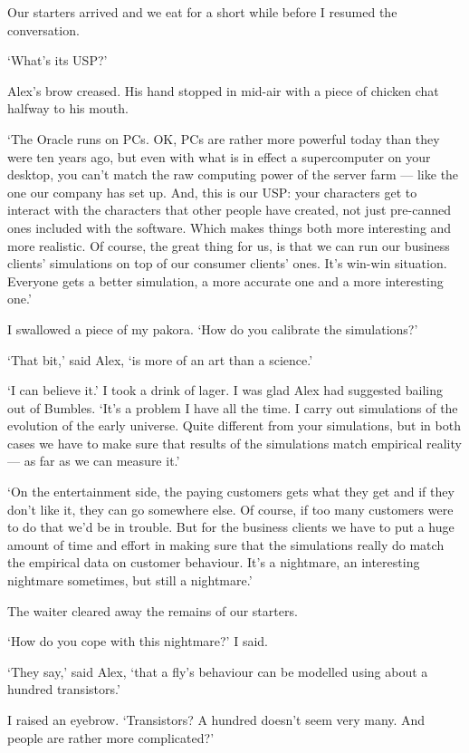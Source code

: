 Our starters arrived and we eat for a short while before I resumed the conversation.

`What's its USP?'

Alex's brow creased. His hand stopped in mid-air with a piece of
chicken chat halfway to his mouth.

`{\twelvesl The Oracle\/} runs on PCs. OK, PCs are rather
more powerful today than they were ten years ago, but even with what
is in effect a supercomputer on your desktop, you can't match the
raw computing power of the server farm --- like the one our company has set up. And, this is
our USP: your characters get to interact with the characters that
other people have created, not just pre-canned ones included with
the software. Which makes things both more interesting and more
realistic. Of course, the great thing for us, is that we can run our
business clients' simulations on top of our consumer clients' ones.
It's win-win situation. Everyone gets a better simulation, a more accurate one and a more interesting one.'

I swallowed a piece of my pakora. `How do you calibrate the simulations?'

`That bit,' said Alex, `is more of an art than a science.'

`I can believe it.' I took a drink of lager. I was glad
Alex had suggested bailing out of Bumbles. `It's a problem I have all
the time. I carry out simulations of the evolution of the early
universe. Quite different from your simulations, but in both
cases we have to make sure that results of the simulations match
empirical reality --- as far as we can measure it.'

`On the entertainment side, the paying customers gets what they get and if
they don't like it, they can go somewhere else. Of course, if too many
customers were to do that we'd be in trouble. But for the business clients we
have to put a huge amount of time and effort in making sure that the
simulations really do match the empirical data on customer
behaviour. It's a nightmare, an interesting nightmare sometimes, but
still a nightmare.'

The waiter cleared away the remains of our
starters.

`How do you cope with this nightmare?' I said.

`They say,' said Alex, `that a fly's behaviour can be modelled using
about a hundred transistors.'

I raised an eyebrow. `Transistors? A hundred doesn't seem very many. And people are rather more complicated?'


